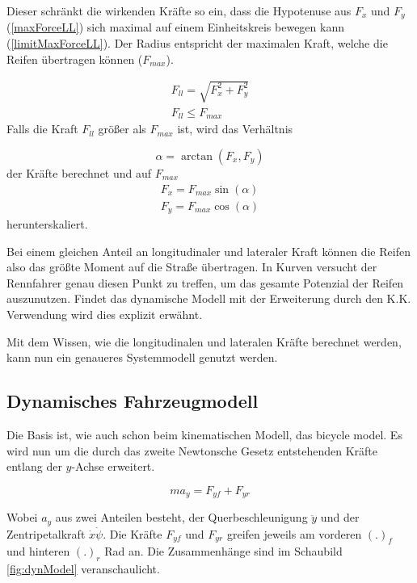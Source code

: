\documentclass{like}
\begin{document}
Dieser schränkt die wirkenden Kräfte so ein, dass die Hypotenuse aus \(F_x\) und \(F_y\) (\ref{maxForceLL}) sich maximal auf einem Einheitskreis bewegen kann (\ref{limitMaxForceLL}). Der Radius entspricht der maximalen Kraft, welche die Reifen übertragen können (\(F_{max}\)).

\begin{eqnarray}
F_{ll} = \sqrt{F_x^2 + F_y^2} \label{maxForceLL} \\
F_{ll} \leq F_{max}  \label{limitMaxForceLL}
\end{eqnarray}
Falls die Kraft $F_{ll}$ größer als $F_{max}$ ist, wird das Verhältnis 

\begin{equation}
	\alpha = \arctan(F_x, F_y)
\end{equation}
der Kräfte berechnet und auf $F_{max}$ 
\begin{eqnarray}
F_x = F_{max} \sin(\alpha)\\
F_y = F_{max} \cos(\alpha)
\end{eqnarray}
herunterskaliert.


Bei einem gleichen Anteil an longitudinaler und lateraler Kraft können die Reifen also das größte Moment auf die Straße übertragen. In Kurven versucht der Rennfahrer genau diesen Punkt zu treffen, um das gesamte Potenzial der Reifen auszunutzen. Findet das dynamische Modell mit der Erweiterung durch den \ac{K.K.} Verwendung wird dies explizit erwähnt. 

Mit dem Wissen, wie die longitudinalen und lateralen Kräfte berechnet werden, kann nun ein genaueres Systemmodell genutzt werden.

\subsection{Dynamisches Fahrzeugmodell}
\label{dynModel}

Die Basis ist, wie auch schon beim kinematischen Modell, das bicycle model. Es wird nun um die durch das zweite Newtonsche Gesetz entstehenden Kräfte entlang der \(y\)-Achse erweitert.

\begin{equation}
ma_y = F_{yf} + F_{yr}
\end{equation}   


Wobei \(a_y\) aus zwei Anteilen besteht, der Querbeschleunigung \(\ddot{y}\) und der Zentripetalkraft \(\dot{x} \dot{\psi}\).  
Die Kräfte \(F_{yf}\) und \(F_{yr}\) greifen jeweils am vorderen \((.)_f\) und hinteren \((.)_r\) Rad an. Die Zusammenhänge sind im Schaubild \ref{fig:dynModel} veranschaulicht. 
\end{document}
